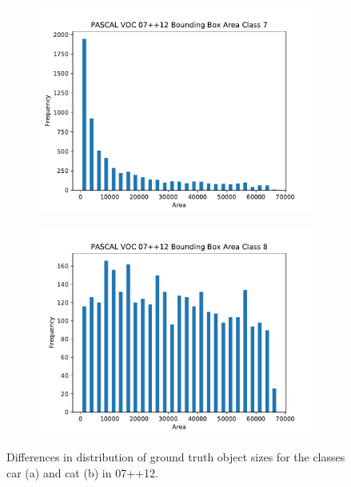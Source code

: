 \begin{figure}[H]
    \centering
    \begin{subfigure}[b]{0.45\textwidth}
        \center
        \includegraphics[width=\textwidth]{Figs/Conclusion/trainvalhist_class7.pdf}
        \caption{}\label{fig:}
    \end{subfigure}
    \begin{subfigure}[b]{0.45\textwidth}
        \center
        \includegraphics[width=\textwidth]{Figs/Conclusion/trainvalhist_class8.pdf}
        \caption{}\label{fig:}
    \end{subfigure}
    \caption{Differences in distribution of ground truth object sizes for the classes car (a) and cat (b) in 07++12.}
    \label{fig:classskew}
\end{figure} 

